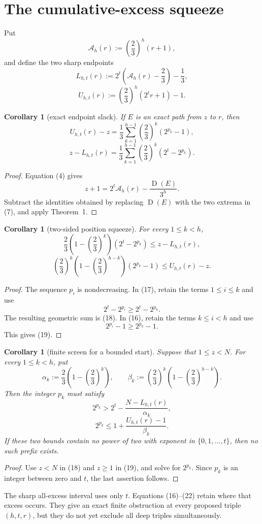 \documentclass[11pt]{article}
\newtheorem{corollary}[theorem]{Corollary}
\newcommand{\sh}{\operatorname{D}}
\begin{document}
\section{The cumulative-excess squeeze}

Put
\[
 \mathcal A_h(r):=\left(\frac23\right)^h(r+1),
 \tag{13}
\]
and define the two sharp endpoints
\[
 L_{h,t}(r)
 :=2^t\left(\mathcal A_h(r)-\frac23\right)-\frac13,
 \tag{14}
\]
\[
 U_{h,t}(r)
 :=\left(\frac23\right)^h(2^t r+1)-1.
 \tag{15}
\]

\begin{corollary}[exact endpoint slack]
If \(E\) is an exact path from \(z\) to \(r\), then
\[
 \boxed{
 U_{h,t}(r)-z
 =
 \frac13\sum_{k=1}^{h-1}
 \left(\frac23\right)^k(2^{p_k}-1),}
 \tag{16}
\]
\[
 \boxed{
 z-L_{h,t}(r)
 =
 \frac13\sum_{k=1}^{h-1}
 \left(\frac23\right)^k(2^t-2^{p_k}).}
 \tag{17}
\]
\end{corollary}

\begin{proof}
Equation (4) gives
\[
 z+1=2^t\mathcal A_h(r)-\frac{\sh(E)}{3^h}.
 \]
Subtract the identities obtained by replacing \(\sh(E)\) with the two
extrema in (7), and apply Theorem~1.
\end{proof}

\begin{corollary}[two-sided position squeeze]
For every \(1\leq k<h\),
\[
 \boxed{
 \frac23\left(1-\left(\frac23\right)^k\right)
 (2^t-2^{p_k})
 \leq z-L_{h,t}(r),}
 \tag{18}
\]
\[
 \boxed{
 \left(\frac23\right)^k
 \left(1-\left(\frac23\right)^{h-k}\right)
 (2^{p_k}-1)
 \leq U_{h,t}(r)-z.}
 \tag{19}
\]
\end{corollary}

\begin{proof}
The sequence \(p_i\) is nondecreasing.  In (17), retain the terms
\(1\leq i\leq k\) and use
\[
 2^t-2^{p_i}\geq2^t-2^{p_k}.
 \]
The resulting geometric sum is (18).  In (16), retain the terms
\(k\leq i<h\) and use
\[
 2^{p_i}-1\geq2^{p_k}-1.
 \]
This gives (19).
\end{proof}

\begin{corollary}[finite screen for a bounded start]
Suppose that \(1\leq z<N\).  For every \(1\leq k<h\), put
\[
 \alpha_k:=\frac23\left(1-\left(\frac23\right)^k\right),
 \qquad
 \beta_k:=\left(\frac23\right)^k
 \left(1-\left(\frac23\right)^{h-k}\right).
 \tag{20}
\]
Then the integer \(p_k\) must satisfy
\[
 \boxed{
 2^{p_k}>
 2^t-\frac{N-L_{h,t}(r)}{\alpha_k},}
 \tag{21}
\]
\[
 \boxed{
 2^{p_k}\leq
 1+\frac{U_{h,t}(r)-1}{\beta_k}.}
 \tag{22}
\]
If these two bounds contain no power of two with exponent in
\(\{0,1,\ldots,t\}\), then no such prefix exists.
\end{corollary}

\begin{proof}
Use \(z<N\) in (18) and \(z\geq1\) in (19), and solve for
\(2^{p_k}\).  Since \(p_k\) is an integer between zero and \(t\), the
last assertion follows.
\end{proof}

The sharp all-excess interval uses only \(t\).  Equations (16)--(22)
retain where that excess occurs.  They give an exact finite obstruction
at every proposed triple \((h,t,r)\), but they do not yet exclude all
deep triples simultaneously.
\end{document}
